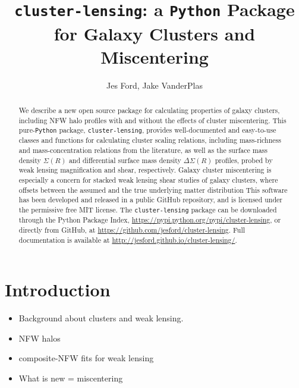 \documentclass{emulateapj}
\begin{document}
\title{\MakeLowercase{\lstinline{cluster-lensing}}: a \lstinline{P}\MakeLowercase{\lstinline{ython}} Package for Galaxy Clusters and Miscentering}
\author{
Jes Ford,  
Jake VanderPlas
}



\begin{abstract}
We describe a new open source package for calculating properties of galaxy clusters, including NFW halo profiles with and without the effects of cluster miscentering. This pure-\lstinline{Python} package, \lstinline{cluster-lensing}, provides well-documented and easy-to-use classes and functions for calculating cluster scaling relations, including mass-richness and mass-concentration relations from the literature, as well as the surface mass density $\Sigma(R)$ and differential surface mass density $\Delta\Sigma(R)$ profiles, probed by weak lensing magnification and shear, respectively. Galaxy cluster miscentering is especially a concern for stacked weak lensing shear studies of galaxy clusters, where offsets between the assumed and the true underlying matter distribution
This software has been developed and released in a public GitHub repository, and is licensed under the permissive free MIT license. The \lstinline{cluster-lensing} package can be downloaded through the Python Package Index, \url{https://pypi.python.org/pypi/cluster-lensing}, or directly from GitHub, at \url{https://github.com/jesford/cluster-lensing}. Full documentation is available at \url{http://jesford.github.io/cluster-lensing/}.
\end{abstract}


\setcounter{section}{0}
\setcounter{subsection}{0}
\setcounter{subsubsection}{0}

\section{Introduction}
\label{intro}

\begin{itemize} \itemsep -2pt
\item Background about clusters and weak lensing.
\item NFW halos \citep{nfw97, Wright00}
\item composite-NFW fits for weak lensing \citep{Ford12, Ford14, Ford15}
\item What is new = miscentering \citep{Johnston07, George12, Ford14, Ford15}
\end{itemize}
\end{document}
